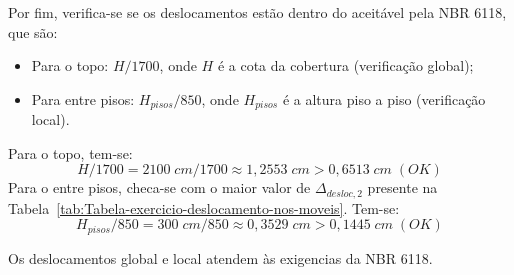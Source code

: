 Por fim, verifica-se se os deslocamentos estão dentro do aceitável pela NBR 6118, que são:

\begin{itemize}
	\item Para o topo: $H/1700$, onde $H$ é a cota da cobertura (verificação global);
	\item Para entre pisos: $H_{pisos}/850$, onde $H_{pisos}$ é a altura piso a piso (verificação local).
\end{itemize}

Para o topo, tem-se: $$H/1700=2100\;cm/1700\approx1,2553\;cm>0,6513\;cm\;(OK)$$
Para o entre pisos, checa-se com o maior valor de $\Delta_{desloc, 2}$ presente na Tabela~\ref{tab:Tabela-exercicio-deslocamento-nos-moveis}. Tem-se: $$H_{pisos}/850=300\;cm/850\approx0,3529\;cm>0,1445\;cm\;(OK)$$

Os deslocamentos global e local atendem às exigencias da NBR 6118.